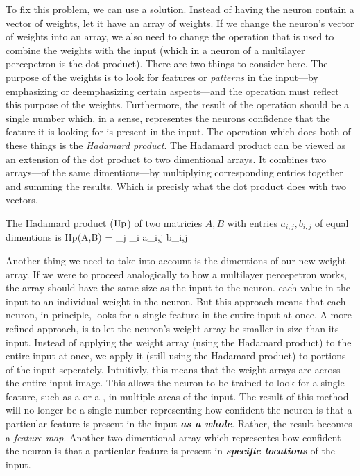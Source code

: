 To fix this problem, we can use a  solution.
Instead of having the neuron contain a vector of weights, let it have an array of weights.
If we change the neuron's vector of weights into an array, we also need to change the operation that is used to combine the weights with the input (which in a neuron of a multilayer percepetron is the dot product).
There are two things to consider here.
The purpose of the weights is to look for features or {\em patterns} in the input---by emphasizing or deemphasizing certain aspects---and the operation must reflect this purpose of the weights.
Furthermore, the result of the operation should be a single number which, in a sense, representes the neurons  confidence that the feature it is looking for is present in the input.
The operation which does both of these things is the {\em Hadamard product}.
The Hadamard product can be viewed as an extension of the dot product to two dimentional arrays.
It combines two arrays---of the same dimentions---by multiplying corresponding entries together and summing the results.
Which is precisly what the dot product does with two vectors.

The Hadamard product (${\rm Hp}$) of two matricies $A,B$ with entries $a_{i,j},b_{i,j}$ of equal dimentions is
\startplaceformula[reference=hdprod]
\startformula
{\rm Hp}(A,B) = \sum_{j} \sum_{i} a_{i,j} \cdot b_{i,j}
\stopformula
\stopplaceformula

\indentation
Another thing we need to take into account is the dimentions of our new weight array.
If we were to proceed analogically to how a multilayer percepetron works, the array should have the same size as the input to the neuron.
 each value in the input to an individual weight in the neuron.
But this approach means that each neuron, in principle, looks for a single feature in the entire input at once.
A more refined approach, is to let the neuron's weight array be smaller in size than its input.
Instead of applying the weight array (using the Hadamard product) to the entire input at once, we apply it (still using the Hadamard product) to portions of the input seperately.
Intuitivly, this means that the weight arrays are  across the entire input image.
This allows the neuron to be trained to look for a single feature, such as a  or a , in multiple areas of the input.
The result of this method will no longer be a single number representing how  confident the neuron is that a particular feature is present in the input {\em\bf as a whole}.
Rather, the result becomes a {\em feature map}.
Another two dimentional array which representes how  confident the neuron is that a particular feature is present in {\em\bf specific locations} of the input.

